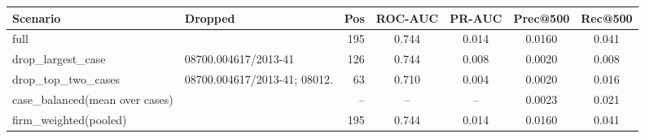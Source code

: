 \begin{tabular}{llrcccc}
\toprule
Scenario & Dropped & Pos & ROC-AUC & PR-AUC & Prec@500 & Rec@500 \\
\midrule
full &  & 195 & 0.744 & 0.014 & 0.0160 & 0.041 \\
drop\_largest\_case & 08700.004617/2013-41 & 126 & 0.744 & 0.008 & 0.0020 & 0.008 \\
drop\_top\_two\_cases & 08700.004617/2013-41; 08012. & 63 & 0.710 & 0.004 & 0.0020 & 0.016 \\
case\_balanced(mean over cases) &  & -- & -- & -- & 0.0023 & 0.021 \\
firm\_weighted(pooled) &  & 195 & 0.744 & 0.014 & 0.0160 & 0.041 \\
\bottomrule
\end{tabular}

